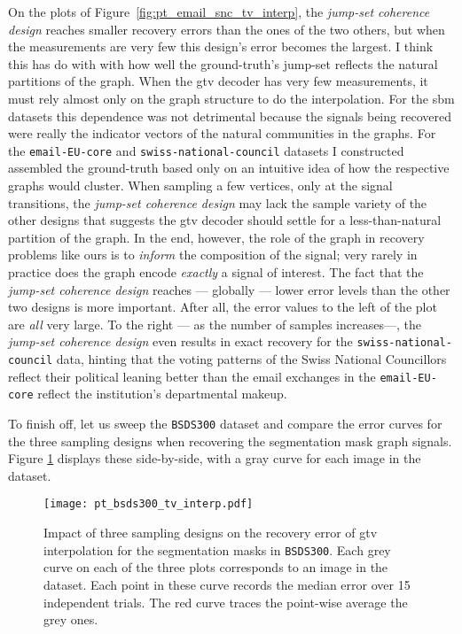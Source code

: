 On the plots of Figure~\ref{fig:pt_email_snc_tv_interp}, the \emph{jump-set coherence design} reaches smaller recovery errors than the ones of the two others, but when the measurements are very few this design's error becomes the largest. I think this has do with with how well the ground-truth's jump-set reflects the natural partitions of the graph. When the \acrshort{gtv} decoder has very few measurements, it must rely almost only on the graph structure to do the interpolation. For the \acrshort{sbm} datasets this dependence was not detrimental because the signals being recovered were really the indicator vectors of the natural communities in the graphs. For the \texttt{email-EU-core} and \texttt{swiss-national-council} datasets I constructed assembled the ground-truth based only on an intuitive idea of how the respective graphs would cluster. When sampling a few vertices, only at the signal transitions, the \emph{jump-set coherence design} may lack the sample variety of the other designs that suggests the \acrshort{gtv} decoder should settle for a less-than-natural partition of the graph. In the end, however, the role of the graph in recovery problems like ours is to \emph{inform} the composition of the signal; very rarely in practice does the graph encode \emph{exactly} a signal of interest. The fact that the \emph{jump-set coherence design} reaches --- globally --- lower error levels than the other two designs is more important. After all, the error values to the left of the plot are \emph{all} very large. To the right --- as the number of samples increases---, the \emph{jump-set coherence design} even results in exact recovery for the \texttt{swiss-national-council} data, hinting that the voting patterns of the Swiss National Councillors reflect their political leaning better than the email exchanges in the \texttt{email-EU-core} reflect the institution's departmental makeup.

To finish off, let us sweep the \texttt{BSDS300} dataset and compare the error curves for the three sampling designs when recovering the segmentation mask graph signals. Figure \ref{fig:pt_bsds300_tv_interp} displays these side-by-side, with a gray curve for each image in the dataset.

\begin{figure}[H]
    \centering
    \texttt{[image: pt\_bsds300\_tv\_interp.pdf]}
    \caption[Three sampling designs: \texttt{BSDS300}]{Impact of three sampling designs on the recovery error of \acrshort{gtv} interpolation for the segmentation masks in \texttt{BSDS300}. Each grey curve on each of the three plots corresponds to an image in the dataset. Each point in these curve records the median error over 15 independent trials. The red curve traces the point-wise average the grey ones.}
    \label{fig:pt_bsds300_tv_interp}
\end{figure}

